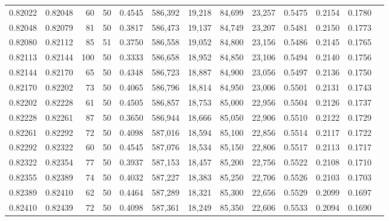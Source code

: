 \begin{tabular}{rrrrrrrrrrrrr}
0.82022 & 0.82048 &    60 &  50 &                                     0.4545 & 586,392 &  19,218 &  84,699 &  23,257 & 0.5475 & 0.2154 & 0.1780 \\
0.82048 & 0.82079 &    81 &  50 &                                     0.3817 & 586,473 &  19,137 &  84,749 &  23,207 & 0.5481 & 0.2150 & 0.1773 \\
0.82080 & 0.82112 &    85 &  51 &                                     0.3750 & 586,558 &  19,052 &  84,800 &  23,156 & 0.5486 & 0.2145 & 0.1765 \\
0.82113 & 0.82144 &   100 &  50 &                                     0.3333 & 586,658 &  18,952 &  84,850 &  23,106 & 0.5494 & 0.2140 & 0.1756 \\
0.82144 & 0.82170 &    65 &  50 &                                     0.4348 & 586,723 &  18,887 &  84,900 &  23,056 & 0.5497 & 0.2136 & 0.1750 \\
0.82170 & 0.82202 &    73 &  50 &                                     0.4065 & 586,796 &  18,814 &  84,950 &  23,006 & 0.5501 & 0.2131 & 0.1743 \\
0.82202 & 0.82228 &    61 &  50 &                                     0.4505 & 586,857 &  18,753 &  85,000 &  22,956 & 0.5504 & 0.2126 & 0.1737 \\
0.82228 & 0.82261 &    87 &  50 &                                     0.3650 & 586,944 &  18,666 &  85,050 &  22,906 & 0.5510 & 0.2122 & 0.1729 \\
0.82261 & 0.82292 &    72 &  50 &                                     0.4098 & 587,016 &  18,594 &  85,100 &  22,856 & 0.5514 & 0.2117 & 0.1722 \\
0.82292 & 0.82322 &    60 &  50 &                                     0.4545 & 587,076 &  18,534 &  85,150 &  22,806 & 0.5517 & 0.2113 & 0.1717 \\
0.82322 & 0.82354 &    77 &  50 &                                     0.3937 & 587,153 &  18,457 &  85,200 &  22,756 & 0.5522 & 0.2108 & 0.1710 \\
0.82355 & 0.82389 &    74 &  50 &                                     0.4032 & 587,227 &  18,383 &  85,250 &  22,706 & 0.5526 & 0.2103 & 0.1703 \\
0.82389 & 0.82410 &    62 &  50 &                                     0.4464 & 587,289 &  18,321 &  85,300 &  22,656 & 0.5529 & 0.2099 & 0.1697 \\
0.82410 & 0.82439 &    72 &  50 &                                     0.4098 & 587,361 &  18,249 &  85,350 &  22,606 & 0.5533 & 0.2094 & 0.1690 \\

\end{tabular}
